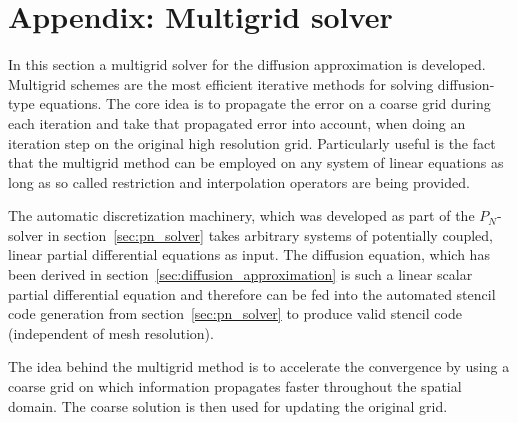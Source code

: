 \chapter{Appendix: Multigrid solver}
\label{sec:da_solver}

In this section a multigrid solver for the diffusion approximation is developed. Multigrid schemes are the most efficient iterative methods for solving diffusion-type equations. The core idea is to propagate the error on a coarse grid during each iteration and take that propagated error into account, when doing an iteration step on the original high resolution grid. Particularly useful is the fact that the multigrid method can be employed on any system of linear equations as long as so called restriction and interpolation operators are being provided. 

The automatic discretization machinery, which was developed as part of the $P_N$-solver in section~\ref{sec:pn_solver} takes arbitrary systems of potentially coupled, linear partial differential equations as input. The diffusion equation, which has been derived in section~\ref{sec:diffusion_approximation} is such a linear scalar partial differential equation and therefore can be fed into the automated stencil code generation from section~\ref{sec:pn_solver} to produce valid stencil code (independent of mesh resolution).

The idea behind the multigrid method is to accelerate the convergence by using a coarse grid on which information propagates faster throughout the spatial domain. The coarse solution is then used for updating the original grid.

